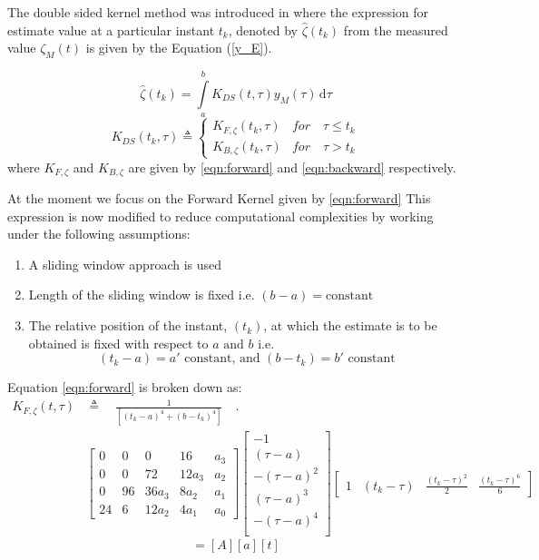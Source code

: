 \documentclass[letterpaper%
, twoside%
, 12pt%
,memoire%
, english%
,creativecommons,hyperref%
]{thETS}
\theoremstyle{newThmStyle}
\begin{document}
The double sided kernel method was introduced in \citep{RN76} where the expression for estimate value at a particular instant $t_k$, denoted by $\hat{\zeta}(t_k)$ from the measured value $\zeta_M(t)$ is given by the Equation (\ref{y_E}). 

\begin{equation}\label{y_E}
\hat{\zeta}(t_k) = \int\limits_{a}^{b}K_{DS}(t,\tau) y_M(\tau)\, \mathrm{d}\tau
\end{equation}
\begin{equation}
K_{DS}(t_k,\tau) \triangleq \left\{
\begin{array}{lr}
K_{F,\zeta}(t_k,\tau) & for \quad \tau \le t_k\\
K_{B,\zeta}(t_k,\tau) & for \quad \tau > t_k
\end{array}
\right.
\label{K}
\end{equation}
where $K_{F,\zeta}$ and $K_{B,\zeta}$ are given by \eqref{eqn:forward} and \eqref{eqn:backward} respectively. 

At the moment we focus on the Forward Kernel given by \eqref{eqn:forward} This expression is now modified to reduce computational complexities by working under the following assumptions:
\begin{enumerate}
\item A sliding window approach is used
\item Length of the sliding window is fixed i.e. $(b-a)=\textrm{constant}$
\item The relative position of the instant, $(t_k)$,  at which the estimate is to be obtained is fixed with respect to $a\textrm{ and }b \textrm{ i.e. }$ $$ (t_k-a)= a' \textrm{ constant, and } (b-t_k)=b'\textrm{ constant}$$  
\end{enumerate}
Equation \eqref{eqn:forward} is broken down as:
\begin{align} \label{eqn:kernVec1}
K_{F,\zeta}(t,\tau) &\triangleq \quad \frac{1}{[(t_k-a)^4+(b-t_k)^4]} \quad .\nonumber\\
&\begin{bmatrix}
0  &  0  &   0   &  16    &   a_3   \\
0  &  0  &   72   & 12a_3  &   a_2  \\
0  &  96 & 36a_3 &  8a_2  &   a_1   \\
24 &  6  & 12a_2 &  4a_1   &   a_0  
\end{bmatrix}
\begin{bmatrix}
     - 1       \\
 (\tau - a)    \\
-(\tau - a)^2  \\
 (\tau - a)^3  \\
-(\tau - a)^4  \\
\end{bmatrix}
\begin{bmatrix}
1  & (t_k-\tau) & \frac{(t_k-\tau)^2}{2} & \frac{(t_k-\tau)^6}{6}
\end{bmatrix}
\end{align}
\begin{equation} \label{eqn:kernVec2}
= [A][a][t] 
\end{equation}
\end{document}
